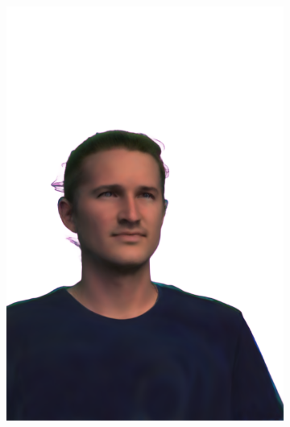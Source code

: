 \begin{figure}[ht]
\begin{subfigure}{0.08\linewidth}
        \includegraphics[width=\textwidth]{Figures/results/low/ephra_3d/11_render.png}

\end{subfigure}
\end{figure}
